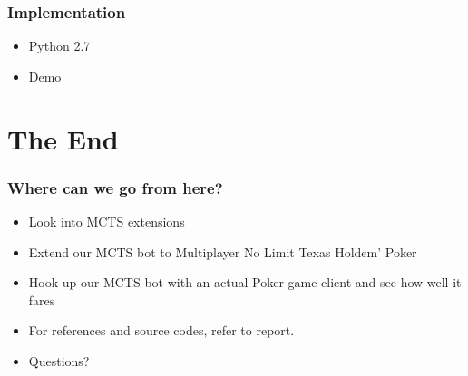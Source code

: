 \documentclass{beamer}
\begin{document}
  \begin{frame}
    \frametitle{Implementation}
    \begin{itemize}
      \item Python 2.7
      \item Demo
    \end{itemize}
  \end{frame}

  \section{The End}
  
  \begin{frame}
    \frametitle{Where can we go from here?}
    \begin{itemize}
      \item Look into MCTS extensions
      \item Extend our MCTS bot to Multiplayer No Limit Texas Holdem' Poker
      \item Hook up our MCTS bot with an actual Poker game client and see how well it fares
    \end{itemize}
  \end{frame}
  
  \begin{frame}
    \begin{itemize}
      \frametitle{Thank you for your time}
      \item For references and source codes, refer to report.
      \item Questions?
    \end{itemize}
  \end{frame}
\end{document}

